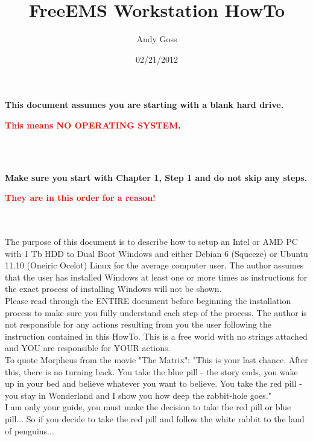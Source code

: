 \documentclass[12pt,notitlepage,onecolumn,oneside,openany,draft]{memoir}
\title{\textsf{FreeEMS Workstation HowTo}}
\author{\textsf{Andy Goss}}
\date{\textsf{02/21/2012}}
\begin{document}
\maketitle

\centerline{\textbf{\textsf{This document assumes you are starting with a blank hard drive.}}} \newline
\centerline{\textbf{\textsf{\textcolor{red}{This means NO OPERATING SYSTEM}.}}} \newline
\\
\textcolor{white}{x}
\\
\centerline{\textbf{\textsf{Make sure you start with Chapter 1, Step 1 and do not skip any steps.}}} \newline
\centerline{\textbf{\textsf{\textcolor{red}{They are in this order for a reason!}}}} \newline
\\
\textcolor{white}{x}
\\
\textsf{The purpose of this document is to describe how to setup an Intel or AMD PC with 1 Tb HDD to Dual Boot Windows and either Debian 6 (Squeeze) or Ubuntu 11.10 (Oneiric Ocelot) Linux for the average computer user.  The author assumes that the user has installed Windows at least one or more times as instructions for the exact process of installing Windows will not be shown.} \newline
\\
\textsf{Please read through the ENTIRE document before beginning the installation process to make sure you fully understand each step of the process.  The author is not responsible for any actions resulting from you the user following the instruction contained in this HowTo. This is a free world with no strings attached and YOU are responsible for YOUR actions.} \newline
\\
\textsf{To quote Morpheus from the movie "The Matrix": "This is your last chance. After this, there is no turning back. You take the blue pill - the story ends, you wake up in your bed and believe whatever you want to believe. You take the red pill - you stay in Wonderland and I show you how deep the rabbit-hole goes."} \newline
\\
\textsf{I am only your guide, you must make the decision to take the red pill or blue pill...} \newline
\textsf{So if you decide to take the red pill and follow the white rabbit to the land of penguins...} \newline
\end{document}
